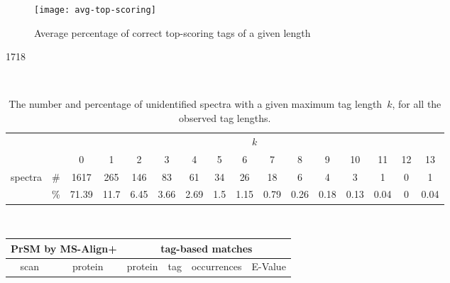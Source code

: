 \documentclass{article}[12pt]
\begin{document}
\begin{figure}
  \begin{center}
\texttt{[image: avg-top-scoring]}
\end{center}
\caption{Average percentage of correct top-scoring tags of a given length}
  \label{fig:avg-top-scoring}
\end{figure}





\begin{landscape}

1718
\begin{table}[h]
\vspace{3mm}\
{\centering
\begin{center}
\begin{tabular}{|c|c|
c|c|c|c|c|c|c|c|c|c|c|c|c|c|}
  \hline
  \multicolumn{2}{|c|}{} & \multicolumn{ 14}{|c|}{$k$} \\
  \cline{3-16}
  \multicolumn{2}{|c|}{} 
 & 0 & 1 & 2 & 3 & 4 & 5 & 6 & 7 & 8 & 9 & 10 & 11 & 12 & 13\\
  \hline
  \multirow{2}{*}{spectra} & \#
 & 1617 & 265 & 146 & 83 & 61 & 34 & 26 & 18 & 6 & 4 & 3 & 1 & 0 & 1\\
   & \%
 & 71.39 & 11.7 & 6.45 & 3.66 & 2.69 & 1.5 & 1.15 & 0.79 & 0.26 & 0.18 & 0.13 & 0.04 & 0 & 0.04\\
  \hline
\end{tabular}
\end{center}
\par}
\centering
\caption{The number and percentage of unidentified spectra with a given maximum tag length~$k$, for all the observed tag lengths.}
\vspace{3mm}
\label{table:unident-tags}
\end{table}


\begin{table}[h]\footnotesize
\vspace{3mm}\
{\centering
\begin{center}
\begin{tabular}{|c|c||c|c|c|c|}
  \hline
  \multicolumn{2}{|c||}{PrSM by MS-Align+} & \multicolumn{4}{|c|}{tag-based matches} \\
  \hline
  scan & protein & protein & tag & occurrences & E-Value\\


\end{tabular}
\end{center}}
\end{table}
\end{landscape}
\end{document}
